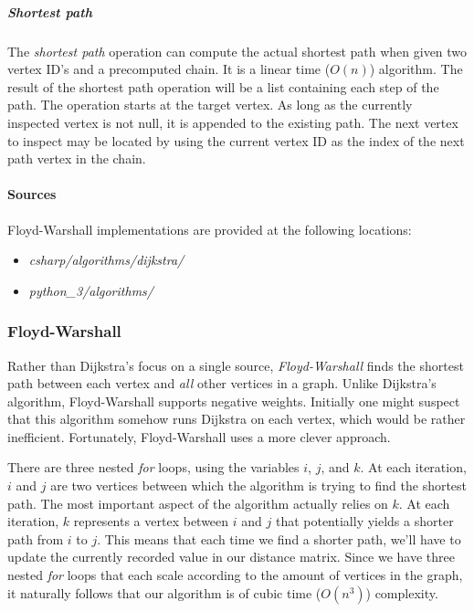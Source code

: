 \documentclass{article}
\begin{document}
\subparagraph{Shortest path}
The {\em shortest path} operation can compute the actual shortest path when given two vertex ID's and a precomputed
chain. It is a linear time (\(O(n)\)) algorithm. The result of the shortest path operation will be a list containing
each step of the path. The operation starts at the target vertex. As long as the currently inspected vertex is not
null, it is appended to the existing path. The next vertex to inspect may be located by using the current vertex ID
as the index of the next path vertex in the chain.

\begin{samepage}
  \paragraph{Sources}
  Floyd-Warshall implementations are provided at the following locations:
  \begin{itemize}
  \item{{\em csharp/algorithms/dijkstra/}}
  \item{{\em python\_3/algorithms/}}
  \end{itemize}
\end{samepage}


\subsubsection{Floyd-Warshall}
Rather than Dijkstra's focus on a single source, {\em Floyd-Warshall} finds the shortest path between each vertex
and {\em all} other vertices in a graph. Unlike Dijkstra's algorithm, Floyd-Warshall supports negative weights.
Initially one might suspect that this algorithm somehow runs Dijkstra on each vertex, which would be rather
inefficient. Fortunately, Floyd-Warshall uses a more clever approach.

There are three nested {\em for} loops, using the variables \(i\), \(j\), and \(k\). At each iteration,
\(i\) and \(j\) are two vertices between which the algorithm is trying to find the shortest path. The most important
aspect of the algorithm actually relies on \(k\). At each iteration, \(k\) represents a vertex between \(i\) and
\(j\) that potentially yields a shorter path from \(i\) to \(j\). This means that each time we find a shorter path,
we'll have to update the currently recorded value in our distance matrix. Since we have three nested {\em for} loops
that each scale according to the amount of vertices in the graph, it naturally follows that our algorithm is of
cubic time (\(O(n^3)\)) complexity.
\end{document}
